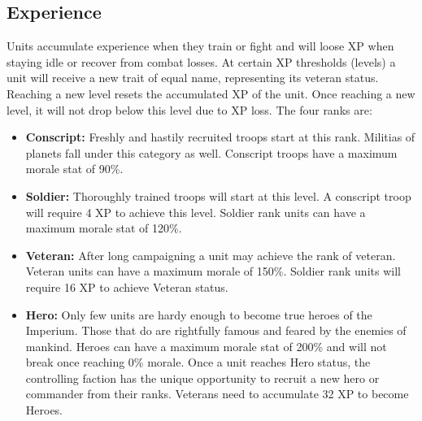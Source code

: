 \subsection{Experience}
Units accumulate experience when they train or fight and will loose XP when staying idle or recover from combat losses. 
At certain XP thresholds (levels) a unit will receive a new trait of equal name, representing its veteran status. 
Reaching a new level resets the accumulated XP of the unit.
Once reaching a new level, it will not drop below this level due to XP loss.
The four ranks are:
\begin{itemize}
	\item \textbf{Conscript:} Freshly and hastily recruited troops start at this rank. Militias of planets fall under this category as well. Conscript troops have a maximum morale stat of 90\%.
	\item \textbf{Soldier:} Thoroughly trained troops will start at this level. A conscript troop will require 4 XP to achieve this level. Soldier rank units can have a maximum morale stat of 120\%.
	\item \textbf{Veteran:} After long campaigning a unit may achieve the rank of veteran. Veteran units can have a maximum morale of 150\%. Soldier rank units will require 16 XP to achieve Veteran status.
	\item \textbf{Hero:} Only few units are hardy enough to become true heroes of the Imperium. Those that do are rightfully famous and feared by the enemies of mankind. Heroes can have a maximum morale stat of 200\% and will not break once reaching 0\% morale. Once a unit reaches Hero status, the controlling faction has the unique opportunity to recruit a new hero or commander from their ranks. Veterans need to accumulate 32 XP to become Heroes.
\end{itemize}

